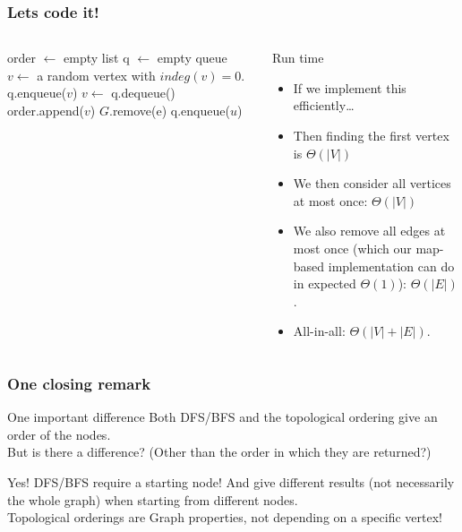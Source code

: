 \begin{frame}
	\frametitle{Lets code it!}
	
	\begin{columns}
		{
	\small
	\begin{algorithmic}
		\State order $\gets$ empty list
		\State q $\gets$ empty queue
		\pause
		\State $v \gets$ a random vertex with $\mathit{indeg}(v) = 0$.
		\State q.enqueue($v$)
		\pause
		\State $v \gets$ q.dequeue()
		\State order.append($v$)
		\pause
		\State $G$.remove(e)
		\pause
		\State q.enqueue($u$)
		\pause
		\EndIf
		\EndFor
		\EndWhile
		\EndFunction
	\end{algorithmic}
}
			
			\begin{block}{Run time}
				\begin{itemize}
					\item If we implement this efficiently\dots
						\pause
					\item Then finding the first vertex is $\Theta(|V|)$
						\pause
					\item We then consider all vertices at most once: $\Theta(|V|)$
						\pause
					\item We also remove all edges at most once (which our map-based implementation can do in expected
						$\Theta(1)$): $\Theta(|E|)$.
					\item All-in-all: $\Theta(|V| + |E|)$.
				\end{itemize}	
			\end{block}	
			
	\end{columns}
\end{frame}

\begin{frame}
	\frametitle{One closing remark}
	
		\begin{questionblock}{One important difference}
			Both DFS/BFS and the topological ordering give an order of the nodes.\\
			\pause
			But is there a difference? (Other than the order in which they are returned?)
		\end{questionblock}	

		\pause
		\begin{answerblock}{Yes!}
			DFS/BFS require a starting node! And give different results (not necessarily the whole graph) when starting from
			different nodes.\\
			\pause
			Topological orderings are Graph properties, not depending on a specific vertex!
		\end{answerblock}
\end{frame}
